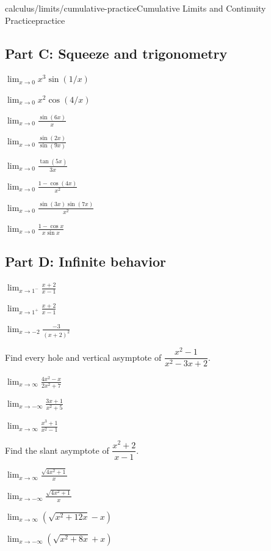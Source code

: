 \documentclass[11pt,openany]{book}
\theoremstyle{bgplain}
\begin{document}
\begin{webpage}{calculus/limits/cumulative-practice}{Cumulative Limits and Continuity Practice}{practice}
\subsection*{Part C: Squeeze and trigonometry}
\begin{bgexercises}[label=\textbf{R\arabic*.},resume]
  \item \(\displaystyle\lim_{x\to0}x^3\sin(1/x)\)
  \item \(\displaystyle\lim_{x\to0}x^2\cos(4/x)\)
  \item \(\displaystyle\lim_{x\to0}\frac{\sin(6x)}x\)
  \item \(\displaystyle\lim_{x\to0}\frac{\sin(2x)}{\sin(9x)}\)
  \item \(\displaystyle\lim_{x\to0}\frac{\tan(5x)}{3x}\)
  \item \(\displaystyle\lim_{x\to0}\frac{1-\cos(4x)}{x^2}\)
  \item \(\displaystyle\lim_{x\to0}\frac{\sin(3x)\sin(7x)}{x^2}\)
  \item \(\displaystyle\lim_{x\to0}\frac{1-\cos x}{x\sin x}\)
\end{bgexercises}

\subsection*{Part D: Infinite behavior}
\begin{bgexercises}[label=\textbf{R\arabic*.},resume]
  \item \(\displaystyle\lim_{x\to1^-}\frac{x+2}{x-1}\)
  \item \(\displaystyle\lim_{x\to1^+}\frac{x+2}{x-1}\)
  \item \(\displaystyle\lim_{x\to-2}\frac{-3}{(x+2)^2}\)
  \item Find every hole and vertical asymptote of \(\dfrac{x^2-1}{x^2-3x+2}\).
  \item \(\displaystyle\lim_{x\to\infty}\frac{4x^2-x}{2x^2+7}\)
  \item \(\displaystyle\lim_{x\to-\infty}\frac{3x+1}{x^2+5}\)
  \item \(\displaystyle\lim_{x\to\infty}\frac{x^3+1}{x^2-1}\)
  \item Find the slant asymptote of \(\dfrac{x^2+2}{x-1}\).
  \item \(\displaystyle\lim_{x\to\infty}\frac{\sqrt{4x^2+1}}x\)
  \item \(\displaystyle\lim_{x\to-\infty}\frac{\sqrt{4x^2+1}}x\)
  \item \(\displaystyle\lim_{x\to\infty}(\sqrt{x^2+12x}-x)\)
  \item \(\displaystyle\lim_{x\to-\infty}(\sqrt{x^2+8x}+x)\)
\end{bgexercises}


\end{webpage}
\end{document}
